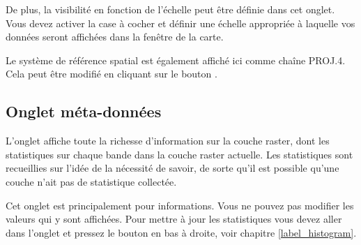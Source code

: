 De plus, la visibilité en fonction de l'échelle peut être définie dans cet
onglet. Vous devez activer la case à cocher et définir une échelle appropriée à laquelle vos données seront affichées dans la fenêtre de la carte.

Le système de référence spatial est également affiché ici comme chaîne PROJ.4. Cela peut être modifié en cliquant sur le bouton .

\subsection{Onglet méta-données}\label{label_metatab}

L'onglet  affiche toute la richesse d'information sur la
couche raster, dont les statistiques sur chaque bande dans la couche raster actuelle. Les statistiques sont recueillies sur l'idée de la \og nécessité de savoir\fg, de sorte qu'il est possible qu'une couche n'ait pas de statistique collectée. 

Cet onglet est principalement pour informations. Vous ne pouvez pas modifier les valeurs qui y sont affichées. Pour mettre à jour les statistiques vous devez aller dans l'onglet  et pressez le bouton
 en bas à droite, voir chapitre \ref{label_histogram}.

